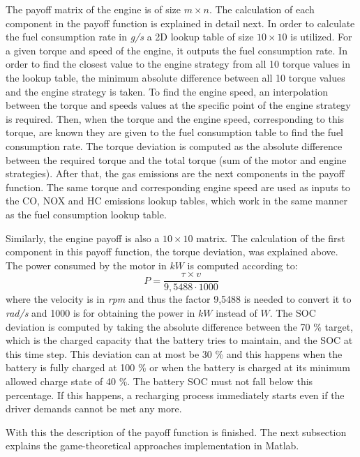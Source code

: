 The payoff matrix of the engine is of size $m \times n$. The calculation of each component in the payoff function is explained in detail next. In order to calculate the fuel consumption rate in \textit{g/s} a 2D lookup table of size $10 \times 10$ is utilized. For a given torque and speed of the engine, it outputs the fuel consumption rate. In order to find the closest value to the engine strategy from all 10 torque values in the lookup table, the minimum absolute difference between all 10 torque values and the engine strategy is taken. To find the engine speed, an interpolation between the torque and speeds values at the specific point of the engine strategy is required. Then, when the torque and the engine speed, corresponding to this torque, are known they are given to the fuel consumption table to find the fuel consumption rate. The torque deviation is computed as the absolute difference between the required torque and the total torque (sum of the motor and engine strategies). After that, the gas emissions are the next components in the payoff function. The same torque and corresponding engine speed are used as inputs to the CO, NOX and HC emissions lookup tables, which work in the same manner as the fuel consumption lookup table.

Similarly, the engine payoff is also a $10 \times 10$ matrix. The calculation of the first component in this payoff function, the torque deviation, was explained above. The power consumed by the motor in $kW$ is computed according to:
\begin{equation}
P = \frac{\tau \times v}{9,5488 \cdot 1000}
\end{equation}
where the velocity is in \textit{rpm} and thus the factor 9,5488 is needed to convert it to \textit{rad/s} and 1000 is for obtaining the power in $kW$ instead of $W$. The SOC deviation is computed by taking the absolute difference between the 70 \% target, which is the charged capacity that the battery tries to maintain, and the SOC at this time step. This deviation can at most be 30 \% and this happens when the battery is fully charged at 100 \% or when the battery is charged at its minimum allowed charge state of 40 \%. The battery SOC must not fall below this percentage. If this happens, a recharging process immediately starts even if the driver demands cannot be met any more.

With this the description of the payoff function is finished. The next subsection explains the game-theoretical approaches implementation in Matlab.

